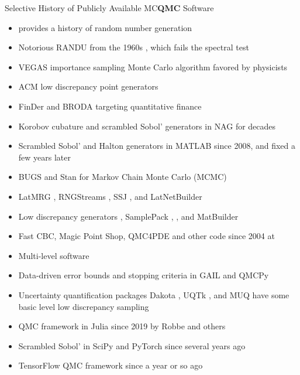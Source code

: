\documentclass[11pt,compress,xcolor={usenames,dvipsnames},aspectratio=169]{beamer}
\begin{document}
\begin{frame}[allowframebreaks]{Selective History of Publicly Available MC\textbf{QMC} Software}
\vspace{-2ex}
	\begin{itemize}
		\item \textcite{LEc2017a} provides a history of \alert{random number generation}
		\item Notorious \alert{RANDU} from the 1960s \parencite{RANDU}, which fails the spectral test
		\item \alert{VEGAS} \parencite{Lep78a, Lep21a} importance sampling Monte Carlo algorithm favored by physicists
		\item \alert{ACM} low discrepancy point generators \parencite{BraFox88,BraFoxNie92,HonHic00a}
		\item \alert{FinDer} \parencite{PasTra95,FinDer} and \alert{BRODA} \parencite{BRODA20a} targeting quantitative finance
		\item Korobov cubature and scrambled Sobol' generators in \alert{NAG} \parencite{NAG27} for decades		
		\item Scrambled Sobol' and Halton generators in \alert{MATLAB} \parencite{MAT9.13} since 2008, and fixed a few years later
		\item \alert{BUGS} \parencite{BUGSBook, BUGSweb} and \alert{Stan} \parencite{STAN} for Markov Chain Monte Carlo (MCMC)
		\item \alert{LatMRG} \parencite{LEcCou97}, \alert{RNGStreams} \parencite{LEcEtal02},  \alert{SSJ} \parencite{LEc2002a,SSJ}, and \alert{LatNetBuilder} \parencite{LatNet}
		\item Low discrepancy generators \parencite{FriKel02,FriKelweb}, \alert{SamplePack} \parencite{SamplePack}, \textcite{GruWeb},  and \alert{MatBuilder} \parencite{paulin2022}
		\item \alert{Fast CBC}, \alert{Magic Point Shop}, \alert{QMC4PDE} and other code since 2004  at \textcite{NuyWeb}
		\item Multi-level software \parencite{GilesSoft,GilesQSoft} 
		\item Data-driven error bounds and stopping criteria in \alert{GAIL} \parencite{ChoEtal21a} and \alert{QMCPy} \parencite{QMCPy2020a, ChoEtal22a} 
		\item Uncertainty quantification packages \alert{Dakota} \parencite{DakotaUsersManual}, \alert{UQTk} \parencite{DebEtal04,UQTk}, and \alert{MUQ} \parencite{MUQ} have some basic level low discrepancy sampling
	    \item QMC framework in Julia since 2019 \parencite{QMCJulia} by Robbe and others
		\item Scrambled Sobol' in \alert{SciPy} \parencite{virtanen2020scipy} and \alert{PyTorch} \parencite{paszke2019pytorch} since several years ago
		\item \alert{TensorFlow} QMC framework \parencite{tfqfQMC2021a} since a year or so ago
		
		
	\end{itemize}
\end{frame}
\end{document}
